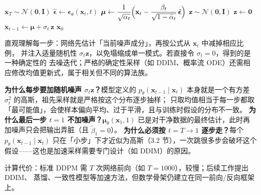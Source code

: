 \documentclass[a4paper,fontset=none,zihao=5]{ctexart}
\numberwithin{equation}{section}
\newcommand{\x}{\mathbf{x}}
\newcommand{\I}{\mathbf{I}}
\newcommand{\N}{\mathcal{N}}
\newcommand{\abar}{\bar{\alpha}}
\newcommand{\eps}{\boldsymbol{\epsilon}}
\newcommand{\epst}{\boldsymbol{\epsilon}_\theta}
\newcommand{\mutheta}{\boldsymbol{\mu}_\theta}
\newcommand{\btil}{\tilde{\beta}}
\begin{document}
\begin{algorithm}[H]
  \caption{DDPM 祖先采样（ancestral sampling）}
  \label{alg:sample}
  \begin{algorithmic}[1]
    \State $\x_T\sim\N(\mathbf{0},\I)$
      \State $\hat{\eps}\gets\epst(\x_t,t)$
      \State $\boldsymbol{\mu}\gets\dfrac{1}{\sqrt{\alpha_t}}\Bigl(\x_t-\dfrac{\beta_t}{\sqrt{1-\abar_t}}\,\hat{\eps}\Bigr)$ 
       \State $\mathbf{z}\sim\N(\mathbf{0},\I)$ \Else \State $\mathbf{z}\gets\mathbf{0}$ \EndIf
      \State $\x_{t-1}\gets\boldsymbol{\mu}+\sigma_t\,\mathbf{z}$ \Comment{重参数化采样；$\sigma_t=\sqrt{\beta_t}$ 或 $\sqrt{\btil_t}$}
    \EndFor
    \State \Return $\x_0$ 
  \end{algorithmic}
\end{algorithm}

直观理解每一步：网络先估计「当前噪声成分」，再按公式从 $\x_t$ 中减掉相应比例，
并注入适量随机性 $\sigma_t\mathbf{z}$，以免塌缩成单一模式。若直接令 $\sigma_t=0$，得到的是一种确定性的
去噪迭代；严格的确定性采样（如 DDIM、概率流 ODE）还需相应修改均值更新式，属于相关但不同的算法族。

\begin{whybox}
\textbf{为什么每步要加随机噪声 $\sigma_t\mathbf{z}$？}模型定义的 $p_\theta(\x_{t-1}\mid\x_t)$ 本身就是一个有方差 $\sigma_t^2$ 的高斯，祖先采样就是严格按这个分布逐步抽样；
只取均值相当于每一步都取「最可能值」，会使样本偏向平均、过于平滑，且与训练时假设的分布不一致。
\textbf{为什么最后一步 $t=1$ 不加噪声？}$\mutheta(\x_1,1)$ 已是对干净数据的最终估计，此时再加噪声只会把输出弄脏（且 $\btil_1=0$）。
\textbf{为什么必须按 $t=T\to1$ 逐步走？}每个 $p_\theta(\x_{t-1}\mid\x_t)$ 只在「小步」下才近似为高斯（3.2 节），一次跳很多步会破坏这个假设——这也是加速采样需要专门设计（如 DDIM）的原因。
\end{whybox}

计算代价：标准 DDPM 需 $T$ 次网络前向（如 $T=1000$），较慢；后续工作提出 DDIM、
蒸馏、一致性模型等加速方法，但数学骨架仍建立在同一前向/反向框架上。

\end{document}
